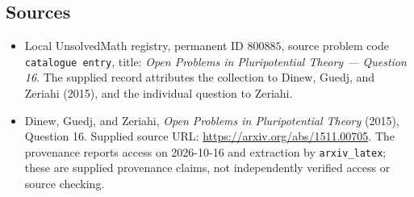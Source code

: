 \documentclass[11pt]{article}
\begin{document}
\subsection{Sources}
\begin{itemize}
\item Local UnsolvedMath registry, permanent ID \(800885\), source problem code \texttt{catalogue entry}, title: \emph{Open Problems in Pluripotential Theory --- Question 16}. The supplied record attributes the collection to Dinew, Guedj, and Zeriahi (2015), and the individual question to Zeriahi.
\item Dinew, Guedj, and Zeriahi, \emph{Open Problems in Pluripotential Theory} (2015), Question 16. Supplied source URL: \url{https://arxiv.org/abs/1511.00705}. The provenance reports access on 2026-10-16 and extraction by \texttt{arxiv\_latex}; these are supplied provenance claims, not independently verified access or source checking.
\end{itemize}
\end{document}
